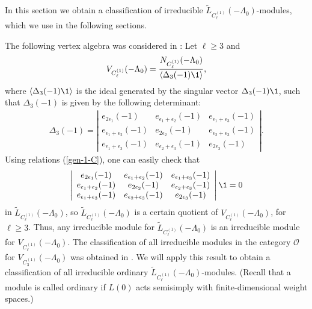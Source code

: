 \documentclass[pdftex]{sigma}
\begin{document}
In this section we obtain a classif\/ication of irreducible
${\widetilde L}_{C_{\ell} ^{(1)}}(- \Lambda_0)$-modules, which we
use in the following sections.

The following vertex algebra was considered in \cite{A1}: Let $\ell
\ge 3$ and \[
V_{C_{\ell} ^{(1)}} (-\Lambda_0)= \frac{N_{C_{\ell} ^{(1)}} (-\Lambda_0)}{\langle \Delta_3 (-1) {\1} \rangle },
\]
where $\langle \Delta_3 (-1) {\1} \rangle$ is the ideal generated by the
singular vector $\Delta_3 (-1) {\1}$, such that $\Delta_3(-1)$ is
given by the following determinant:
\begin{gather*}
 \Delta_3(-1) =
 \left| \begin{array}{ccc} e_{ 2\epsilon_1} (-1) & e_{
\epsilon_1 + \epsilon_2} (-1) &  e_{ \epsilon_1 + \epsilon_3} (-1)
\\ e_{ \epsilon_1 + \epsilon_2} (-1) & e_{ 2
\epsilon_2} (-1)&  e_{ \epsilon_2 + \epsilon_3} (-1)
\\e_{ \epsilon_1
+ \epsilon_3} (-1) & e_{ \epsilon_2 + \epsilon_3} (-1) & e_{ 2
\epsilon_3} (-1)
\end{array} \right|.
 \end{gather*}
Using relations (\ref{gen-1-C}), one can easily check that
\begin{gather*}
 \left| \begin{array}{ccc} e_{ 2\epsilon_1} (-1) & e_{
\epsilon_1 + \epsilon_2} (-1) &  e_{ \epsilon_1 + \epsilon_3} (-1)
\\ e_{ \epsilon_1 + \epsilon_2} (-1) & e_{ 2
\epsilon_2} (-1)&  e_{ \epsilon_2 + \epsilon_3} (-1)
\\e_{ \epsilon_1
+ \epsilon_3} (-1) & e_{ \epsilon_2 + \epsilon_3} (-1) & e_{ 2
\epsilon_3} (-1)
\end{array} \right| {\1}=0
 \end{gather*}
in $\widetilde{L}_{C_{\ell} ^{(1)}} (-\Lambda_0)$, so
$\widetilde{L}_{C_{\ell} ^{(1)}} (-\Lambda_0)$ is a certain quotient
of $V_{C_{\ell} ^{(1)}} (-\Lambda_0)$, for $\ell \ge 3$. Thus, any
irreducible module for $\widetilde{L}_{C_{\ell} ^{(1)}}
(-\Lambda_0)$ is an irreducible module for $V_{C_{\ell} ^{(1)}}
(-\Lambda_0)$. The classif\/ication of all irreducible modules in the
category $\mathcal{O}$  for $V_{C_{3} ^{(1)}} (-\Lambda_0)$ was
obtained in \cite[Example 4.1]{A1}. We will apply this result to
obtain a classif\/ication of all irreducible ordinary
$\widetilde{L}_{C_{\ell} ^{(1)}} (-\Lambda_0)$-modules. (Recall
that a module is called ordinary  if $L(0)$ acts semisimply with
f\/inite-dimensional weight spaces.)
\end{document}
